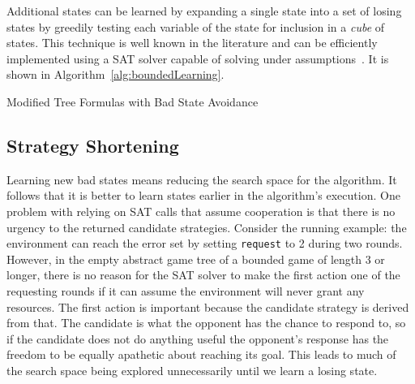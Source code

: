 Additional states can be learned by expanding a single state into a set of losing states by greedily testing each variable of the state for inclusion in a \emph{cube} of states. This technique is well known in the literature and can be efficiently implemented using a SAT solver capable of solving under assumptions~\cite{Een03}. It is shown in Algorithm~\ref{alg:boundedLearning}.

\begin{algorithm}
    \caption{Modified Tree Formulas with Bad State Avoidance}
    \label{alg:treeFormulaLearning}
    \begin{algorithmic}[1]
        \State {}
        \Else
        \State {}
        \EndIf
        \EndFunction
    \end{algorithmic}

    \begin{algorithmic}[1]
        \State {}
        \Else
        \State {}
        \EndIf
        \EndFunction
    \end{algorithmic}
\end{algorithm}

\subsection{Strategy Shortening}

Learning new bad states means reducing the search space for the algorithm. It follows that it is better to learn states earlier in the algorithm's execution. One problem with relying on SAT calls that assume cooperation is that there is no urgency to the returned candidate strategies. Consider the running example: the environment can reach the error set by setting \texttt{request} to 2 during two rounds. However, in the empty abstract game tree of a bounded game of length 3 or longer, there is no reason for the SAT solver to make the first action one of the requesting rounds if it can assume the environment will never grant any resources. The first action is important because the candidate strategy is derived from that. The candidate is what the opponent has the chance to respond to, so if the candidate does not do anything useful the opponent's response has the freedom to be equally apathetic about reaching its goal. This leads to much of the search space being explored unnecessarily until we learn a losing state.

